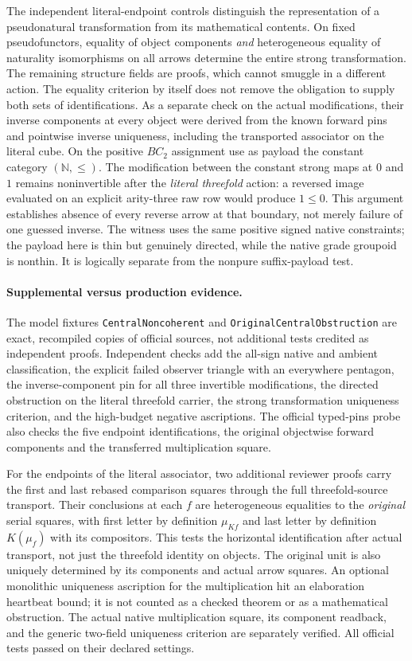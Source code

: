 \documentclass[11pt]{article}
\newcommand{\nm}[1]{\nolinkurl{#1}}
\begin{document}
The independent literal-endpoint controls distinguish the representation of a
pseudonatural transformation from its mathematical contents. On fixed
pseudofunctors, equality of object components \emph{and} heterogeneous
equality of naturality isomorphisms on all arrows determine the entire
strong transformation. The remaining structure fields are proofs, which
cannot smuggle in a different action. The equality criterion by itself does
not remove the obligation to supply both sets of identifications.
As a separate check on the actual modifications, their inverse components at
every object were derived from the known forward pins and pointwise inverse
uniqueness, including the transported associator on the literal cube. On the
positive $BC_2$ assignment use as payload the constant category
$(\mathbb N,\leq)$. The modification between the constant strong maps at
$0$ and $1$ remains noninvertible after the \emph{literal threefold}
action: a reversed image evaluated on an explicit arity-three raw row
would produce $1\leq0$. This argument establishes absence of every reverse
arrow at that boundary, not merely failure of one guessed inverse. The
witness uses the same positive signed native constraints; the payload
here is thin but genuinely directed, while the native grade groupoid is
nonthin. It is logically separate from the nonpure suffix-payload test.
\paragraph{Supplemental versus production evidence.}
The model fixtures \nm{CentralNoncoherent} and \nm{OriginalCentralObstruction}
are exact, recompiled copies of official sources, not additional tests credited
as independent proofs. Independent checks add the all-sign native and ambient
classification, the explicit failed observer triangle with an everywhere
pentagon, the inverse-component pin for all three invertible modifications,
the directed obstruction on the literal threefold carrier, the strong
transformation uniqueness criterion, and the high-budget negative
ascriptions. The official typed-pins probe also checks the five endpoint
identifications, the original objectwise forward components and the transferred
multiplication square.

For the endpoints of the literal associator, two additional reviewer proofs
carry the first and last rebased comparison squares through the full
threefold-source transport. Their conclusions at each $f$ are heterogeneous
equalities to the \emph{original} serial squares, with first letter by
definition $\mu_{Kf}$ and last letter by definition $K(\mu_f)$ with
its compositors. This tests the horizontal identification after actual
transport, not just the threefold identity on objects. The original unit is
also uniquely determined by its components and actual arrow squares.
An optional monolithic uniqueness ascription for the multiplication hit an
elaboration heartbeat bound; it is not counted as a checked theorem or as
a mathematical obstruction. The actual native multiplication square, its
component readback, and the generic two-field uniqueness criterion are
separately verified. All official tests passed on their declared settings.
\end{document}
